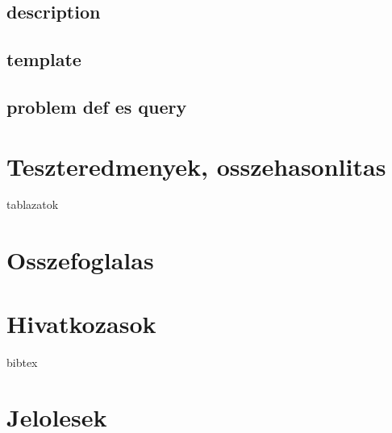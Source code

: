 \documentclass {report}
\begin{document}
    \section{description}
    \section{template}
    \section{problem def es query}

\chapter{Teszteredmenyek, osszehasonlitas}
tablazatok

\chapter{Osszefoglalas}

\chapter*{Hivatkozasok}
bibtex

\appendix

\chapter{Jelolesek}
\end{document}
